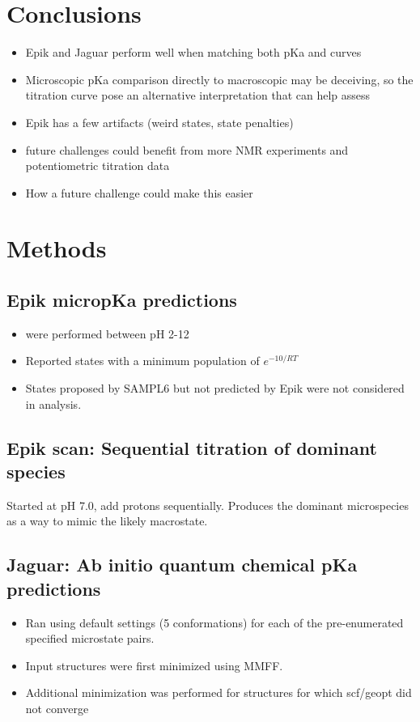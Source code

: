 \documentclass[9pt,lineno,final]{elife}
\begin{document}
\section{Conclusions}

\begin{itemize}
	\item Epik and Jaguar perform well when matching both pKa and curves
	\item Microscopic pKa comparison directly to macroscopic may be deceiving, so the titration curve pose an alternative interpretation that can help assess
	\item Epik has a few artifacts (weird states, state penalties)
	\item future challenges could benefit from more NMR experiments and potentiometric titration data
	\item How a future challenge could make this easier
\end{itemize}


\section{Methods}

\subsection{Epik micropKa predictions}
\begin{itemize}
	\item were performed between pH 2-12
	\item Reported states with a minimum population of $e^{-10/RT}$
	\item States proposed by SAMPL6 but not predicted by Epik were not considered in analysis.
	      
\end{itemize}

\subsection{Epik scan: Sequential titration of dominant species} 


Started at pH 7.0, add protons sequentially. 
%
Produces the dominant microspecies as a way to mimic the likely macrostate.
%


\subsection{Jaguar: Ab initio quantum chemical pKa predictions}
\begin{itemize}
	\item Ran using default settings (5 conformations) for each of the pre-enumerated specified microstate pairs.
	\item Input structures were first minimized using MMFF.
	\item Additional minimization was performed for structures for which scf/geopt did not converge
\end{itemize}
\end{document}
